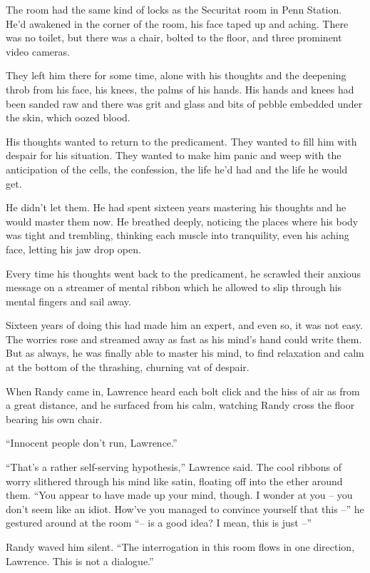 \tb

The room had the same kind of locks as the Securitat room in Penn 
Station. He'd awakened in the corner of the room, his face taped up and 
aching. There was no toilet, but there was a chair, bolted to the 
floor, and three prominent video cameras.

They left him there for some time, alone with his thoughts and the 
deepening throb from his face, his knees, the palms of his hands. His 
hands and knees had been sanded raw and there was grit and glass and 
bits of pebble embedded under the skin, which oozed blood.

His thoughts wanted to return to the predicament. They wanted to fill 
him with despair for his situation. They wanted to make him panic and 
weep with the anticipation of the cells, the confession, the life he'd 
had and the life he would get.

He didn't let them. He had spent sixteen years mastering his thoughts 
and he would master them now. He breathed deeply, noticing the places 
where his body was tight and trembling, thinking each muscle into 
tranquility, even his aching face, letting his jaw drop open.

Every time his thoughts went back to the predicament, he scrawled their 
anxious message on a streamer of mental ribbon which he allowed to slip 
through his mental fingers and sail away.

Sixteen years of doing this had made him an expert, and even so, it was 
not easy. The worries rose and streamed away as fast as his mind's hand 
could write them. But as always, he was finally able to master his 
mind, to find relaxation and calm at the bottom of the thrashing, 
churning vat of despair.

When Randy came in, Lawrence heard each bolt click and the hiss of air 
as from a great distance, and he surfaced from his calm, watching Randy 
cross the floor bearing his own chair.

“Innocent people don't run, Lawrence.”

“That's a rather self-serving hypothesis,” Lawrence said. The cool 
ribbons of worry slithered through his mind like satin, floating off 
into the ether around them. “You appear to have made up your mind, 
though. I wonder at you -- you don't seem like an idiot. How've you 
managed to convince yourself that this --” he gestured around at the 
room “-- is a good idea? I mean, this is just --”

Randy waved him silent. “The interrogation in this room flows in one 
direction, Lawrence. This is not a dialogue.”

